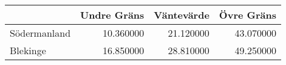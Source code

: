 \begin{tabular}{lrrr}
\toprule
 & Undre Gräns & Väntevärde & Övre Gräns \\
\midrule
Södermanland & 10.360000 & 21.120000 & 43.070000 \\
Blekinge & 16.850000 & 28.810000 & 49.250000 \\
\bottomrule
\end{tabular}

